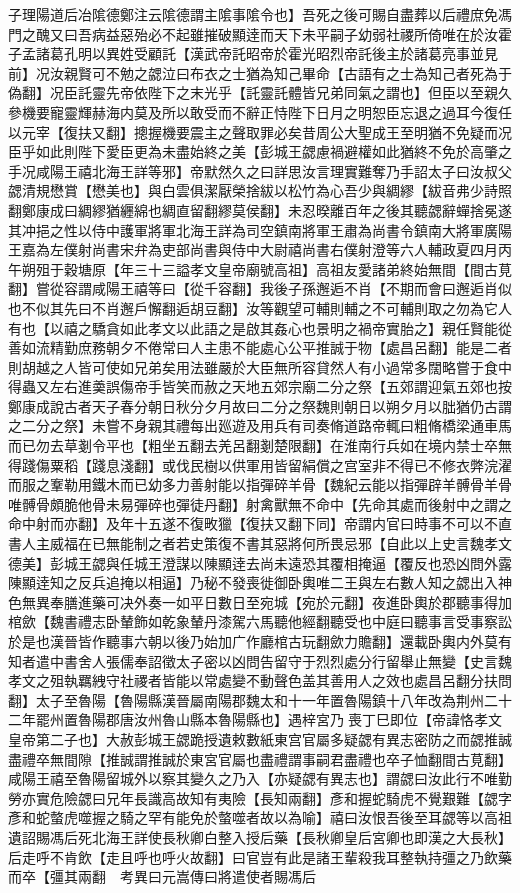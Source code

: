 子理陽道后冶隂德鄭注云隂德謂主隂事隂令也】吾死之後可賜自盡葬以后禮庶免馮門之醜又曰吾病益惡殆必不起雖摧破顯逹而天下未平嗣子幼弱社禝所倚唯在於汝霍子孟諸葛孔明以異姓受顧託【漢武帝託昭帝於霍光昭烈帝託後主於諸葛亮事並見前】况汝親賢可不勉之勰泣曰布衣之士猶為知己畢命【古語有之士為知己者死為于偽翻】况臣託靈先帝依陛下之末光乎【託靈託體皆兄弟同氣之謂也】但臣以至親久參機要寵靈輝赫海内莫及所以敢受而不辭正恃陛下日月之明恕臣忘退之過耳今復任以元宰【復扶又翻】摠握機要震主之聲取罪必矣昔周公大聖成王至明猶不免疑而况臣乎如此則陛下愛臣更為未盡始終之美【彭城王勰慮禍避權如此猶終不免於高肇之手况咸陽王禧北海王詳等邪】帝默然久之曰詳思汝言理實難奪乃手詔太子曰汝叔父勰清規懋賞【懋美也】與白雲俱潔厭榮捨紱以松竹為心吾少與綢繆【紱音弗少詩照翻鄭康成曰綢繆猶纒綿也綢直留翻繆莫侯翻】未忍暌離百年之後其聽勰辭蟬捨冕遂其冲挹之性以侍中護軍將軍北海王詳為司空鎮南將軍王肅為尚書令鎮南大將軍廣陽王嘉為左僕射尚書宋弁為吏部尚書與侍中大尉禧尚書右僕射澄等六人輔政夏四月丙午朔殂于穀塘原【年三十三謚孝文皇帝廟號高祖】高祖友愛諸弟終始無間【間古莧翻】嘗從容謂咸陽王禧等曰【從千容翻】我後子孫邂逅不肖【不期而會曰邂逅肖似也不似其先曰不肖邂戶懈翻逅胡豆翻】汝等觀望可輔則輔之不可輔則取之勿為它人有也【以禧之驕貪如此孝文以此語之是啟其姦心也景明之禍帝實胎之】親任賢能從善如流精勤庶務朝夕不倦常曰人主患不能處心公平推誠于物【處昌呂翻】能是二者則胡越之人皆可使如兄弟矣用法雖嚴於大臣無所容貸然人有小過常多闊略嘗于食中得蟲又左右進羮誤傷帝手皆笑而赦之天地五郊宗廟二分之祭【五郊謂迎氣五郊也按鄭康成說古者天子春分朝日秋分夕月故曰二分之祭魏則朝日以朔夕月以朏猶仍古謂之二分之祭】未嘗不身親其禮每出廵遊及用兵有司奏脩道路帝輒曰粗脩橋梁通車馬而已勿去草剗令平也【粗坐五翻去羌呂翻剗楚限翻】在淮南行兵如在境内禁士卒無得踐傷粟稻【踐息淺翻】或伐民樹以供軍用皆留絹償之宫室非不得已不修衣弊浣濯而服之鞌勒用鐵木而已幼多力善射能以指彈碎羊骨【魏紀云能以指彈辟羊髆骨羊骨唯髆骨頗脆他骨未易彈碎也彈徒丹翻】射禽獸無不命中【先命其處而後射中之謂之命中射而亦翻】及年十五遂不復畋獵【復扶又翻下同】帝謂内官曰時事不可以不直書人主威福在已無能制之者若史策復不書其惡將何所畏忌邪【自此以上史言魏孝文德美】彭城王勰與任城王澄謀以陳顯逹去尚未遠恐其覆相掩逼【覆反也恐凶問外露陳顯逹知之反兵追掩以相逼】乃秘不發喪徙御卧輿唯二王與左右數人知之勰出入神色無異奉膳進藥可决外奏一如平日數日至宛城【宛於元翻】夜進卧輿於郡聽事得加棺歛【魏書禮志卧輦飾如乾象輦丹漆駕六馬聽他經翻聽受也中庭曰聽事言受事察訟於是也漢晉皆作聽事六朝以後乃始加广作廳棺古玩翻歛力贍翻】還載卧輿内外莫有知者遣中書舍人張儒奉詔徵太子密以凶問告留守于烈烈處分行留舉止無變【史言魏孝文之殂執羈絏守社禝者皆能以常處變不動聲色盖其善用人之效也處昌呂翻分扶問翻】太子至魯陽【魯陽縣漢晉屬南陽郡魏太和十一年置魯陽鎮十八年改為荆州二十二年罷州置魯陽郡唐汝州魯山縣本魯陽縣也】遇梓宮乃喪丁巳即位【帝諱恪孝文皇帝第二子也】大赦彭城王勰跪授遺敕數紙東宫官屬多疑勰有異志密防之而勰推誠盡禮卒無間隙【推誠謂推誠於東宮官屬也盡禮謂事嗣君盡禮也卒子恤翻間古莧翻】咸陽王禧至魯陽留城外以察其變久之乃入【亦疑勰有異志也】謂勰曰汝此行不唯勤勞亦實危險勰曰兄年長識高故知有夷險【長知兩翻】彥和握蛇騎虎不覺艱難【勰字彥和蛇螫虎噬握之騎之罕有能免於螫噬者故以為喻】禧曰汝恨吾後至耳勰等以高祖遺詔賜馮后死北海王詳使長秋卿白整入授后藥【長秋卿皇后宮卿也即漢之大長秋】后走呼不肯飲【走且呼也呼火故翻】曰官豈有此是諸王輩殺我耳整執持彊之乃飲藥而卒【彊其兩翻　考異曰元嵩傳曰將遣使者賜馮后
